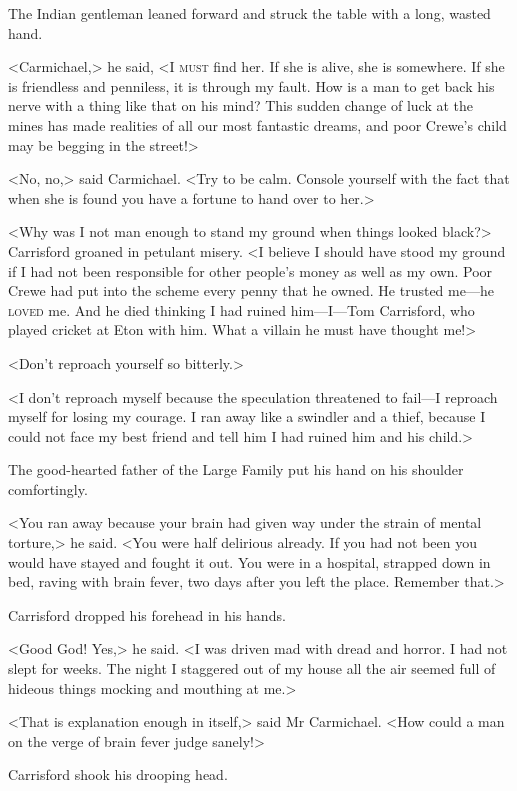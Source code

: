 The Indian gentleman leaned forward and struck the table with a long, wasted hand.

<Carmichael,> he said, <I \textsc{must} find her. If she is alive, she is somewhere. If she is friendless and penniless, it is through my fault. How is a man to get back his nerve with a thing like that on his mind? This sudden change of luck at the mines has made realities of all our most fantastic dreams, and poor Crewe's child may be begging in the street!>

<No, no,> said Carmichael. <Try to be calm. Console yourself with the fact that when she is found you have a fortune to hand over to her.>

<Why was I not man enough to stand my ground when things looked black?> Carrisford groaned in petulant misery. <I believe I should have stood my ground if I had not been responsible for other people's money as well as my own. Poor Crewe had put into the scheme every penny that he owned. He trusted me—he \textsc{loved} me. And he died thinking I had ruined him—I—Tom Carrisford, who played cricket at Eton with him. What a villain he must have thought me!>

<Don't reproach yourself so bitterly.>

<I don't reproach myself because the speculation threatened to fail—I reproach myself for losing my courage. I ran away like a swindler and a thief, because I could not face my best friend and tell him I had ruined him and his child.>

The good-hearted father of the Large Family put his hand on his shoulder comfortingly.

<You ran away because your brain had given way under the strain of mental torture,> he said. <You were half delirious already. If you had not been you would have stayed and fought it out. You were in a hospital, strapped down in bed, raving with brain fever, two days after you left the place. Remember that.>

Carrisford dropped his forehead in his hands.

<Good God! Yes,> he said. <I was driven mad with dread and horror. I had not slept for weeks. The night I staggered out of my house all the air seemed full of hideous things mocking and mouthing at me.>

<That is explanation enough in itself,> said Mr Carmichael. <How could a man on the verge of brain fever judge sanely!>

Carrisford shook his drooping head.

